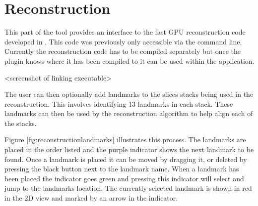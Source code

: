 \clearpage
\section{Reconstruction}\label{implementation:reconstruction}
This part of the tool provides an interface to the fast GPU reconstruction code developed in \cite{uncertaintysvd}. This code was previously only accessible via the command line. Currently the reconstruction code has to be compiled separately but once the plugin knows where it has been compiled to it can be used within the application.

<screenshot of linking executable>

The user can then optionally add landmarks to the slices stacks being used in the reconstruction. This involves identifying 13 landmarks in each stack. These landmarks can then be used by the reconstruction algorithm to help align each of the stacks.

Figure \ref{fig:reconstructionlandmarks} illustrates this process. The landmarks are placed in the order listed and the purple indicator shows the next landmark to be found. Once a landmark is placed it can be moved by dragging it, or deleted by pressing the black button next to the landmark name. When a landmark has been placed the indicator goes green and pressing this indicator will select and jump to the landmarks location. The currently selected landmark is shown in red in the 2D view and marked by an arrow in the indicator.

